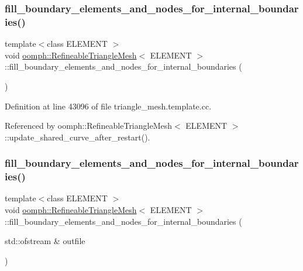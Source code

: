 \subsubsection{\texorpdfstring{fill\+\_\+boundary\+\_\+elements\+\_\+and\+\_\+nodes\+\_\+for\+\_\+internal\+\_\+boundaries()}{fill\_boundary\_elements\_and\_nodes\_for\_internal\_boundaries()}\hspace{0.1cm}{\footnotesize\ttfamily [1/2]}}
{\footnotesize\ttfamily template$<$class E\+L\+E\+M\+E\+NT $>$ \\
void \hyperlink{classoomph_1_1RefineableTriangleMesh}{oomph\+::\+Refineable\+Triangle\+Mesh}$<$ E\+L\+E\+M\+E\+NT $>$\+::fill\+\_\+boundary\+\_\+elements\+\_\+and\+\_\+nodes\+\_\+for\+\_\+internal\+\_\+boundaries (\begin{DoxyParamCaption}{ }\end{DoxyParamCaption})}



Definition at line 43096 of file triangle\+\_\+mesh.\+template.\+cc.



Referenced by oomph\+::\+Refineable\+Triangle\+Mesh$<$ E\+L\+E\+M\+E\+N\+T $>$\+::update\+\_\+shared\+\_\+curve\+\_\+after\+\_\+restart().

\mbox{\label{classoomph_1_1RefineableTriangleMesh_a85db79355838698642937d8dd875970a}} 
\subsubsection{\texorpdfstring{fill\+\_\+boundary\+\_\+elements\+\_\+and\+\_\+nodes\+\_\+for\+\_\+internal\+\_\+boundaries()}{fill\_boundary\_elements\_and\_nodes\_for\_internal\_boundaries()}\hspace{0.1cm}{\footnotesize\ttfamily [2/2]}}
{\footnotesize\ttfamily template$<$class E\+L\+E\+M\+E\+NT $>$ \\
void \hyperlink{classoomph_1_1RefineableTriangleMesh}{oomph\+::\+Refineable\+Triangle\+Mesh}$<$ E\+L\+E\+M\+E\+NT $>$\+::fill\+\_\+boundary\+\_\+elements\+\_\+and\+\_\+nodes\+\_\+for\+\_\+internal\+\_\+boundaries (\begin{DoxyParamCaption}\item[{std\+::ofstream \&}]{outfile }\end{DoxyParamCaption})}



